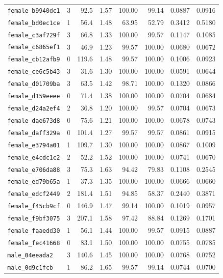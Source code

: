 \documentclass[11pt]{article}
\begin{document}
\begin{longtable}{lrrrrrrr}
\texttt{female\_b9940dc1} & 3 & 92.5 & 1.57 & 100.00 & 99.14 & 0.0887 & 0.0916 \\
\texttt{female\_bd0ec1ce} & 1 & 56.4 & 1.48 & 63.95 & 52.79 & 0.3412 & 0.5180 \\
\texttt{female\_c3af729f} & 3 & 66.8 & 1.33 & 100.00 & 99.57 & 0.1147 & 0.1085 \\
\texttt{female\_c6865ef1} & 3 & 46.9 & 1.23 & 99.57 & 100.00 & 0.0680 & 0.0672 \\
\texttt{female\_cb12afb9} & 0 & 119.6 & 1.48 & 99.57 & 100.00 & 0.1006 & 0.0923 \\
\texttt{female\_ce6c5b43} & 3 & 31.6 & 1.30 & 100.00 & 100.00 & 0.0591 & 0.0644 \\
\texttt{female\_d01709ba} & 3 & 63.5 & 1.42 & 98.71 & 100.00 & 0.1320 & 0.0866 \\
\texttt{female\_d159eeee} & 0 & 71.4 & 1.38 & 100.00 & 100.00 & 0.0704 & 0.0684 \\
\texttt{female\_d24a2ef4} & 2 & 36.8 & 1.20 & 100.00 & 99.57 & 0.0704 & 0.0673 \\
\texttt{female\_dae673d8} & 0 & 75.6 & 1.21 & 100.00 & 100.00 & 0.0678 & 0.0743 \\
\texttt{female\_daff329a} & 0 & 101.4 & 1.27 & 99.57 & 99.57 & 0.0861 & 0.0915 \\
\texttt{female\_e3794a01} & 1 & 109.7 & 1.30 & 100.00 & 100.00 & 0.0867 & 0.1009 \\
\texttt{female\_e4cdc1c2} & 2 & 52.2 & 1.52 & 100.00 & 100.00 & 0.0741 & 0.0670 \\
\texttt{female\_e706da88} & 3 & 75.3 & 1.63 & 94.42 & 79.83 & 0.1108 & 0.2545 \\
\texttt{female\_ed79b65a} & 1 & 37.3 & 1.35 & 100.00 & 100.00 & 0.0666 & 0.0660 \\
\texttt{female\_edcf2449} & 2 & 181.4 & 1.51 & 94.85 & 58.37 & 0.2440 & 0.3871 \\
\texttt{female\_f45cb9cf} & 0 & 146.9 & 1.47 & 99.14 & 100.00 & 0.1019 & 0.0957 \\
\texttt{female\_f9bf3075} & 3 & 207.1 & 1.58 & 97.42 & 88.84 & 0.1269 & 0.1701 \\
\texttt{female\_faaedd30} & 1 & 56.1 & 1.44 & 100.00 & 99.57 & 0.0915 & 0.0887 \\
\texttt{female\_fec41668} & 0 & 83.1 & 1.50 & 100.00 & 100.00 & 0.0755 & 0.0785 \\
\texttt{male\_04eeada2} & 3 & 140.6 & 1.45 & 100.00 & 100.00 & 0.0768 & 0.0752 \\
\texttt{male\_0d9c1fcb} & 1 & 86.2 & 1.65 & 99.57 & 99.14 & 0.0744 & 0.0700 \\

\end{longtable}
\end{document}
